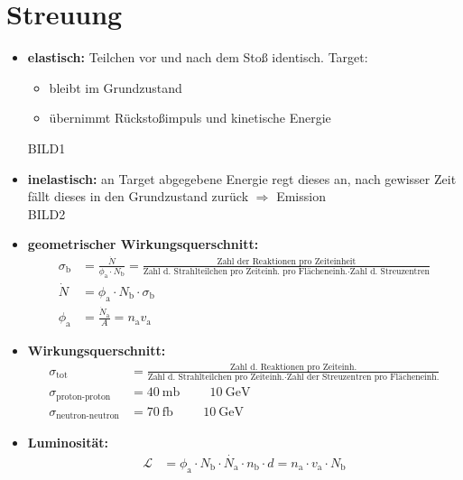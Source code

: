 \documentclass[BCOR=5mm,DIV=calc,listof=totoc,headings=big]{scrartcl}
\newcommand{\lueck}{\hspace{1cm}}
\begin{document}
\section{Streuung}
\label{sec:streuung}
\begin{itemize}
\item \textbf{elastisch:} Teilchen vor und nach dem Stoß identisch. Target:
  \begin{itemize}
  \item bleibt im Grundzustand
  \item übernimmt Rückstoßimpuls und kinetische Energie
  \end{itemize}
  BILD1
\item \textbf{inelastisch:} an Target abgegebene Energie regt dieses
  an, nach gewisser Zeit fällt dieses in den Grundzustand zurück
  $\Rightarrow$ Emission\\
  BILD2
\item \textbf{geometrischer Wirkungsquerschnitt:}
  \begin{align*}
    \sigma_{\mathrm{b}}&=\frac{\dot{N}}{\phi_{\mathrm{a}} \cdot
      N_{\mathrm{b}}}=\frac{\text{Zahl der Reaktionen pro
        Zeiteinheit}}{\text{Zahl d. Strahlteilchen pro Zeiteinh.
        pro Flächeneinh.} \cdot \text{Zahl d. Streuzentren}}\\
    \dot{N}&=\phi_{\mathrm{a}}\cdot N_{\mathrm{b}}\cdot\sigma_{\mathrm{b}}\\
    \phi_{\mathrm{a}}&=\frac{\dot{N}_{\mathrm{a}}}{A}=n_{\mathrm{a}}v_{\mathrm{a}}
  \end{align*}
\item \textbf{Wirkungsquerschnitt:}
  \begin{align*}
    \sigma_{\text{tot}}&=\frac{\text{Zahl d. Reaktionen pro
        Zeiteinh.}}{\text{Zahl d. Strahlteilchen pro Zeiteinh.} \cdot
      \text{Zahl der Streuzentren pro Flächeneinh.}}\\
    \sigma_{\text{proton-proton}}&=\SI{40}{\milli\barn} \lueck \SI{10}{\giga\electronvolt}\\
    \sigma_{\text{neutron-neutron}}&=\SI{70}{\femto\barn} \lueck \SI{10}{\giga\electronvolt}
  \end{align*}
\item \textbf{Luminosität:}
  \begin{align*}
    \mathcal{L}&=\phi_{\mathrm{a}} \cdot N_{\mathrm{b}} \cdot
    \dot{N_{\mathrm{a}}} \cdot n_{\mathrm{b}} \cdot d = n_{\mathrm{a}}
    \cdot v_{\mathrm{a}} \cdot N_{\mathrm{b}}
  \end{align*}

\end{itemize}
\end{document}
